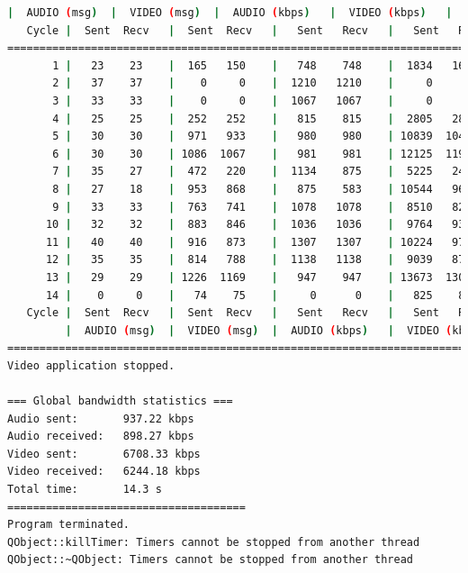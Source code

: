 \begin{lstlisting}[language=bash,basicstyle=\ttfamily\tiny]
         |  AUDIO (msg)  |  VIDEO (msg)  |  AUDIO (kbps)   |  VIDEO (kbps)   |     CPU (%) 
   Cycle |  Sent  Recv   |  Sent  Recv   |   Sent   Recv   |   Sent   Recv   | Program System
================================================================================================
       1 |   23    23    |  165   150    |   748    748    |  1834   1669    |  30      0       
       2 |   37    37    |    0     0    |  1210   1210    |     0      0    |  52     78       
       3 |   33    33    |    0     0    |  1067   1067    |     0      0    |  51     76       
       4 |   25    25    |  252   252    |   815    815    |  2805   2801    |  29     77       
       5 |   30    30    |  971   933    |   980    980    | 10839  10416    |  25     76       
       6 |   30    30    | 1086  1067    |   981    981    | 12125  11914    |  36     78       
       7 |   35    27    |  472   220    |  1134    875    |  5225   2433    |  32     69       
       8 |   27    18    |  953   868    |   875    583    | 10544   9604    |  31     73       
       9 |   33    33    |  763   741    |  1078   1078    |  8510   8264    |  36     73       
      10 |   32    32    |  883   846    |  1036   1036    |  9764   9354    |  35     70       
      11 |   40    40    |  916   873    |  1307   1307    | 10224   9743    |  32     76       
      12 |   35    35    |  814   788    |  1138   1138    |  9039   8750    |  35     75       
      13 |   29    29    | 1226  1169    |   947    947    | 13673  13037    |  30     74       
      14 |    0     0    |   74    75    |     0      0    |   825    836    |   0     42       
   Cycle |  Sent  Recv   |  Sent  Recv   |   Sent   Recv   |   Sent   Recv   | Program System
         |  AUDIO (msg)  |  VIDEO (msg)  |  AUDIO (kbps)   |  VIDEO (kbps)   |     CPU (%) 
===========================================================================================
Video application stopped.

=== Global bandwidth statistics ===
Audio sent:       937.22 kbps
Audio received:   898.27 kbps
Video sent:       6708.33 kbps
Video received:   6244.18 kbps
Total time:       14.3 s
=====================================
Program terminated.
QObject::killTimer: Timers cannot be stopped from another thread
QObject::~QObject: Timers cannot be stopped from another thread
\end{lstlisting}
\vspace{\baselineskip}

